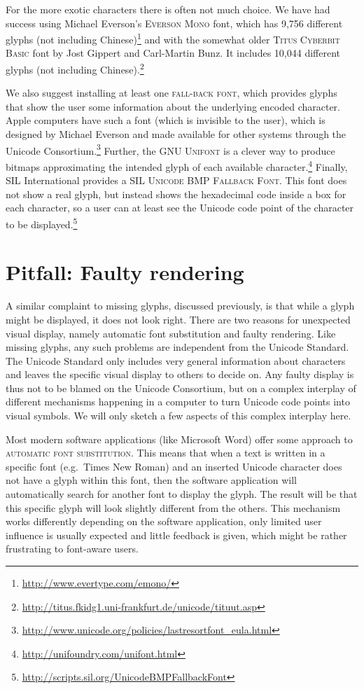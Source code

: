 For the more exotic characters there is often not much choice. We have had success using 
Michael Everson's \textsc{Everson Mono} font, which has 9,756 different glyphs (not including 
Chinese)\footnote{\url{http://www.evertype.com/emono/}} and with the somewhat older \textsc{Titus Cyberbit Basic} font 
by Jost Gippert and Carl-Martin Bunz. It includes 10,044 different glyphs (not including 
Chinese).\footnote{\url{http://titus.fkidg1.uni-frankfurt.de/unicode/tituut.asp}} 

We also suggest installing at least one \textsc{fall-back
font}, which provides glyphs that show the user some information about
the underlying encoded character. Apple computers have such a font (which is
invisible to the user), which is designed by Michael Everson and made available
for other systems through the Unicode Consortium.\footnote{
\url{http://www.unicode.org/policies/lastresortfont\_eula.html}} Further, the
\textsc{GNU Unifont} is a clever way to produce bitmaps approximating the
intended glyph of each available character.\footnote{\url{http://unifoundry.com/unifont.html}} Finally,
SIL International provides a \textsc{SIL Unicode BMP Fallback
Font}. This font does not show a real 
glyph, but instead shows the hexadecimal code inside a box
for each character, so a user can at least see the Unicode code point of the
character to be displayed.\footnote{\url{http://scripts.sil.org/UnicodeBMPFallbackFont}}

\section{Pitfall: Faulty rendering}
\label{pitfall-faulty-rendering}

A similar complaint to missing glyphs, discussed previously, is that while 
a glyph might be displayed, it does not look right. There are two
reasons for unexpected visual display, namely automatic font substitution and
faulty rendering. Like missing glyphs, any such problems are independent from
the Unicode Standard. The Unicode Standard only includes very general
information about characters and leaves the specific visual display to others to
decide on. Any faulty display is thus not to be blamed on the Unicode
Consortium, but on a complex interplay of different mechanisms happening in a
computer to turn Unicode code points into visual symbols. We will only sketch a
few aspects of this complex interplay here.

Most modern software applications (like Microsoft Word) offer some approach to
\textsc{automatic font substitution}. This means that when a text is written in
a specific font (e.g.~Times New Roman) and an inserted Unicode character does not
have a glyph within this font, then the software application will automatically
search for another font to display the glyph. The result will be that this
specific glyph will look slightly different from the others. This mechanism
works differently depending on the software application, only limited
user influence is usually expected and little feedback is given, which might be rather
frustrating to font-aware users.

